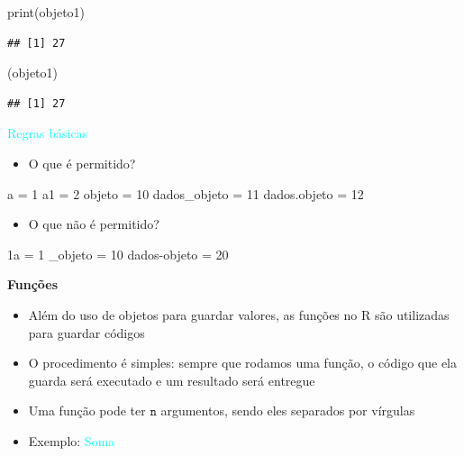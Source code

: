 \documentclass[
]{book}
\newenvironment{Shaded}{\begin{snugshade}}{\end{snugshade}}
\newcommand{\DecValTok}[1]{\textcolor[rgb]{0.00,0.00,0.81}{#1}}
\newcommand{\FunctionTok}[1]{\textcolor[rgb]{0.00,0.00,0.00}{#1}}
\newcommand{\NormalTok}[1]{#1}
\newcommand{\OtherTok}[1]{\textcolor[rgb]{0.56,0.35,0.01}{#1}}
\newcommand{\SpecialCharTok}[1]{\textcolor[rgb]{0.00,0.00,0.00}{#1}}
\providecommand{\tightlist}{%
  \setlength{\itemsep}{0pt}\setlength{\parskip}{0pt}}
\begin{document}
\begin{Shaded}
\begin{Highlighting}[]
\FunctionTok{print}\NormalTok{(objeto1)}
\end{Highlighting}
\end{Shaded}

\begin{verbatim}
## [1] 27
\end{verbatim}

\begin{Shaded}
\begin{Highlighting}[]
\NormalTok{(objeto1)}
\end{Highlighting}
\end{Shaded}

\begin{verbatim}
## [1] 27
\end{verbatim}

\textcolor{cyan}{Regras básicas}

\begin{itemize}
\tightlist
\item
  O que é permitido?
\end{itemize}

\begin{Shaded}
\begin{Highlighting}[]
\NormalTok{a }\OtherTok{=} \DecValTok{1}
\NormalTok{a1 }\OtherTok{=} \DecValTok{2}
\NormalTok{objeto }\OtherTok{=} \DecValTok{10}
\NormalTok{dados\_objeto }\OtherTok{=} \DecValTok{11}
\NormalTok{dados.objeto }\OtherTok{=} \DecValTok{12}
\end{Highlighting}
\end{Shaded}

\begin{itemize}
\tightlist
\item
  O que não é permitido?
\end{itemize}

\begin{Shaded}
\begin{Highlighting}[]
\NormalTok{1a }\OtherTok{=} \DecValTok{1}
\NormalTok{\_objeto }\OtherTok{=} \DecValTok{10}
\NormalTok{dados}\SpecialCharTok{{-}}\NormalTok{objeto }\OtherTok{=} \DecValTok{20}
\end{Highlighting}
\end{Shaded}

\textbf{Funções}

\begin{itemize}
\item
  Além do uso de objetos para guardar valores, as funções no R são utilizadas para guardar códigos
\item
  O procedimento é simples: sempre que rodamos uma função, o código que ela guarda será executado e um resultado será entregue
\item
  Uma função pode ter \(\texttt{n}\) argumentos, sendo eles separados por vírgulas
\item
  Exemplo: \textcolor{cyan}{Soma}
\end{itemize}
\end{document}
